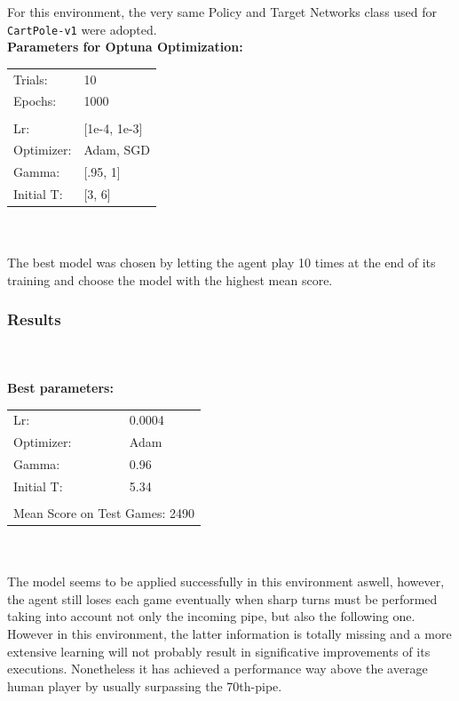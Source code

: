 \documentclass[11pt,a4paper,twocolumn]{IEEEtran}
\newcommand{\thinsepline}{\noindent\makebox[\linewidth]{\rule{7.5cm}{0.02pt}}}
\begin{document}
			For this environment, the very same Policy and Target Networks class used for \texttt{CartPole-v1} were adopted.
			\thinsepline\\
			\textbf{Parameters for Optuna Optimization:}\medskip\\
			\begin{tabular}{ll}
				Trials: & 10 \\
				Epochs: & 1000 \\
				\hline\vspace*{-.4cm}\\
				Lr: & [1e-4, 1e-3] \\
				Optimizer: & Adam, SGD\\
				Gamma: & [.95, 1]\\
				Initial T:& [3, 6]\\
			\end{tabular}\\
			\thinsepline\\
			The best model was chosen by letting the agent play 10 times at the end of its training and choose the model with the highest mean score.\\
			\subsubsection{\textbf{Results}}\text{   }\\
			\thinsepline\\
			\textbf{Best parameters:}\medskip\\
			\begin{tabular}{ll}
				Lr: & 0.0004 \\
				Optimizer: & Adam \\
				Gamma: & 0.96 \\
				Initial T:& 5.34 \\
				\hline\\
				\multicolumn{2}{l}{Mean Score on Test Games: 2490 }
				
			\end{tabular}\\
			\thinsepline\medskip\\
			The model seems to be applied successfully in this environment aswell, however, the agent still loses each game eventually when sharp turns must be performed taking into account not only the incoming pipe, but also the following one. However in this environment, the latter information is totally missing and a more extensive learning will not probably result in significative improvements of its executions. Nonetheless it has achieved a performance way above the average human player by usually surpassing the 70th-pipe.
\end{document}
